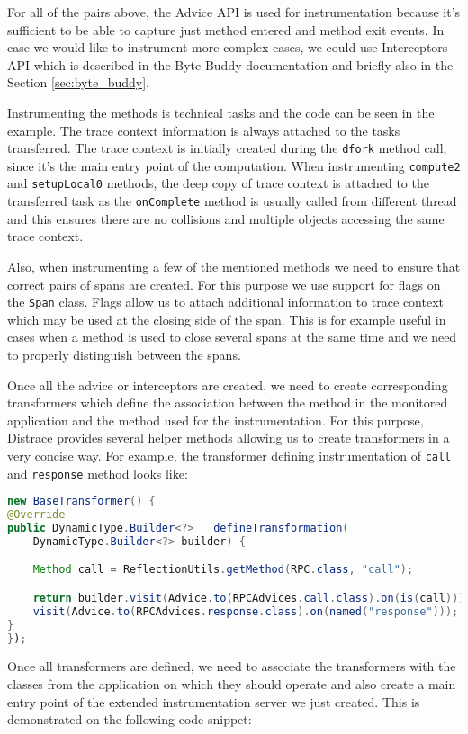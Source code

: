 For all of the pairs above, the Advice API is used for instrumentation because it's sufficient to be able to capture just method entered and method exit events. In case we would like to instrument more complex cases, we could use Interceptors API which is described in the Byte Buddy documentation and briefly also in the Section \ref{sec:byte_buddy}.

Instrumenting the methods is technical tasks and the code can be seen in the example. The trace context information is always attached to the tasks transferred. The trace context is initially created during the \texttt{dfork} method call, since it's the main entry point of the computation. When instrumenting \texttt{compute2} and \texttt{setupLocal0} methods, the deep copy of trace context is attached to the transferred task as the \texttt{onComplete} method is usually called from different thread and this ensures there are no collisions and multiple objects accessing the same trace context.

Also, when instrumenting a few of the mentioned methods we need to ensure that correct pairs of spans are created. For this purpose we use support for flags on the \texttt{Span} class. Flags allow us to attach additional information to trace context which may be used at the closing side of the span. This is for example useful in cases when a method is used to close several spans at the same time and we need to properly distinguish between the spans.

Once all the advice or interceptors are created, we need to create corresponding transformers which define the association between the method in the monitored application and the method used for the instrumentation. For this purpose, Distrace provides several helper methods allowing us to create transformers in a very concise way. For example, the transformer defining instrumentation of \texttt{call} and \texttt{response} method looks like:

\begin{lstlisting}[language=Java]
new BaseTransformer() {
@Override
public DynamicType.Builder<?> 	defineTransformation(
	DynamicType.Builder<?> builder) {

	Method call = ReflectionUtils.getMethod(RPC.class, "call");

	return builder.visit(Advice.to(RPCAdvices.call.class).on(is(call))).
	visit(Advice.to(RPCAdvices.response.class).on(named("response")));
}
});
\end{lstlisting}


Once all transformers are defined, we need to associate the transformers with the classes from the application on which they should operate and also create a main entry point of the extended instrumentation server we just created. This is demonstrated on the following code snippet:

